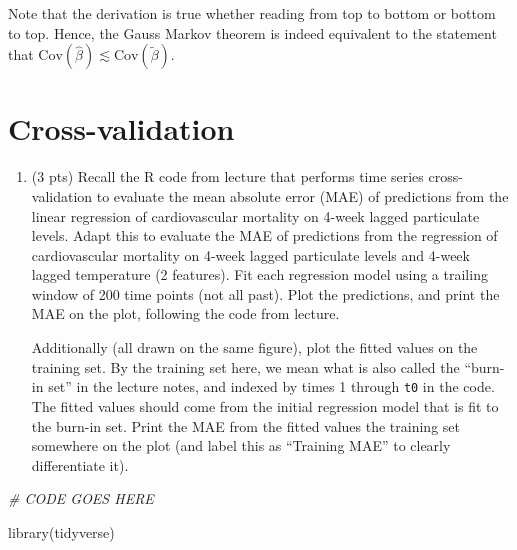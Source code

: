 \documentclass[
]{article}
\newenvironment{Shaded}{\begin{snugshade}}{\end{snugshade}}
\newcommand{\CommentTok}[1]{\textcolor[rgb]{0.56,0.35,0.01}{\textit{#1}}}
\newcommand{\FunctionTok}[1]{\textcolor[rgb]{0.00,0.00,0.00}{#1}}
\newcommand{\NormalTok}[1]{#1}
\begin{document}
Note that the derivation is true whether reading from top to bottom or
bottom to top. Hence, the Gauss Markov theorem is indeed equivalent to
the statement that
\(\mathrm{Cov}(\hat\beta) \lesssim \mathrm{Cov}(\tilde\beta)\).

\hypertarget{cross-validation}{%
\section{Cross-validation}\label{cross-validation}}

\begin{enumerate}
\def\labelenumi{\arabic{enumi}.}
\setcounter{enumi}{11}
\item
  (3 pts) Recall the R code from lecture that performs time series
  cross-validation to evaluate the mean absolute error (MAE) of
  predictions from the linear regression of cardiovascular mortality on
  4-week lagged particulate levels. Adapt this to evaluate the MAE of
  predictions from the regression of cardiovascular mortality on 4-week
  lagged particulate levels and 4-week lagged temperature (2 features).
  Fit each regression model using a trailing window of 200 time points
  (not all past). Plot the predictions, and print the MAE on the plot,
  following the code from lecture.

  Additionally (all drawn on the same figure), plot the fitted values on
  the training set. By the training set here, we mean what is also
  called the ``burn-in set'' in the lecture notes, and indexed by times
  1 through \texttt{t0} in the code. The fitted values should come from
  the initial regression model that is fit to the burn-in set. Print the
  MAE from the fitted values the training set somewhere on the plot (and
  label this as ``Training MAE'' to clearly differentiate it).
\end{enumerate}

\begin{Shaded}
\begin{Highlighting}[]
\CommentTok{\# CODE GOES HERE}

\FunctionTok{library}\NormalTok{(tidyverse)}
\end{Highlighting}
\end{Shaded}
\end{document}
